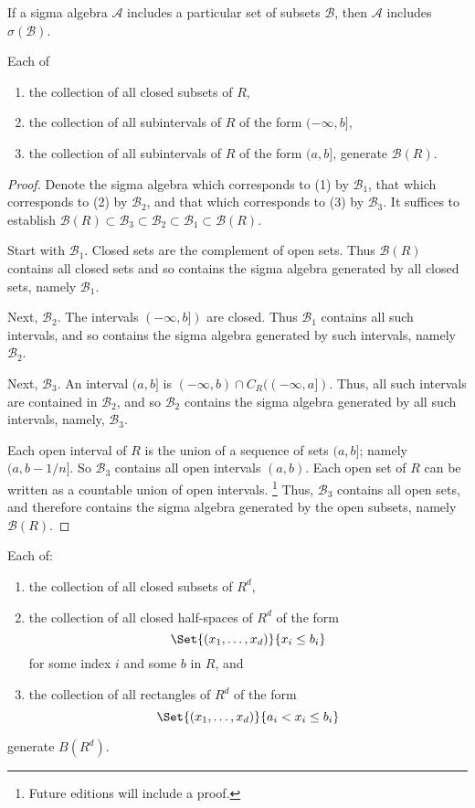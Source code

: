 \begin{proposition}If a sigma algebra $\mathcal{A} $ includes a particular set of subsets $\mathcal{B} $, then $\mathcal{A} $ includes $\sigma (\mathcal{B} )$.\end{proposition}
\begin{proposition}
  \label{borelalternategenerations}Each of
\begin{enumerate}
\item the collection of all closed subsets of $R$,
\item the collection of all subintervals of $R$ of the form $(-\infty, b]$,
\item the collection of all subintervals of $R$ of the form $(a, b]$,
generate $\mathcal{B} (R)$.
\end{enumerate}\end{proposition}
\begin{proof}Denote the sigma algebra which corresponds to (1) by $\mathcal{B} _1$, that which corresponds to (2) by $\mathcal{B} _2$, and that which corresponds to (3) by $\mathcal{B} _3$.
It suffices to establish $\mathcal{B} (R) \subset \mathcal{B} _3 \subset \mathcal{B} _2 \subset \mathcal{B} _1 \subset \mathcal{B} (R)$.

Start with $\mathcal{B} _1$.
Closed sets are the complement of open sets.
Thus $\mathcal{B} (R)$ contains all closed sets and so contains the sigma algebra generated by all closed sets, namely $\mathcal{B} _1$.

Next, $\mathcal{B} _2$.
The intervals $(-\infty, b])$ are closed.
Thus $\mathcal{B} _1$ contains all such intervals, and so contains the sigma algebra generated by such intervals, namely $\mathcal{B} _2$.

Next, $\mathcal{B} _3$.
An interval $(a, b]$ is $(-\infty, b) \cap  C_R((-\infty, a])$.
Thus, all such intervals are contained in $\mathcal{B} _2$, and so $\mathcal{B} _2$ contains the sigma algebra generated by all such intervals, namely, $\mathcal{B} _3$.

Each open interval of $R$ is the union of a sequence of sets $(a, b]$; namely $(a, b-1/n]$.
So $\mathcal{B} _3$ contains all open intervals $(a, b)$.
Each open set of $R$ can be written as a countable union of open intervals.
\ifhmode\unskip\fi\footnote{
Future editions will include a proof.
}
Thus, $\mathcal{B} _3$ contains all open sets, and therefore contains the sigma algebra generated by the open subsets, namely $\mathcal{B} (R)$.
\end{proof}
\begin{proposition}Each of:
\begin{enumerate}
\item the collection of all closed subsets of $R^d$,
\item the collection of all closed half-spaces of $R^d$ of the form
\[
\Set{(x_1, \dots , x_d)}{x_i \leq b_i}
\]
for some index $i$ and some $b$ in $R$, and
\item the collection of all rectangles of $R^d$ of the form
\[
\Set{(x_1, \dots , x_d)}{a_i < x_i \leq b_i}
\]
\end{enumerate}
generate $B(R^d)$.\end{proposition}

